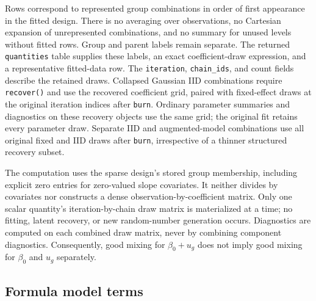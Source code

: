 \documentclass[11pt]{article}
\begin{document}
Rows correspond to represented group combinations in order of first appearance in the fitted design. There is no averaging over observations, no Cartesian expansion of unrepresented combinations, and no summary for unused levels without fitted rows. Group and parent labels remain separate. The returned \texttt{quantities} table supplies these labels, an exact coefficient-draw expression, and a representative fitted-data row. The \texttt{iteration}, \texttt{chain\_ids}, and count fields describe the retained draws. Collapsed Gaussian IID combinations require \texttt{recover()} and use the recovered coefficient grid, paired with fixed-effect draws at the original iteration indices after \texttt{burn}. Ordinary parameter summaries and diagnostics on these recovery objects use the same grid; the original fit retains every parameter draw. Separate IID and augmented-model combinations use all original fixed and IID draws after \texttt{burn}, irrespective of a thinner structured recovery subset.

The computation uses the sparse design's stored group membership, including explicit zero entries for zero-valued slope covariates. It neither divides by covariates nor constructs a dense observation-by-coefficient matrix. Only one scalar quantity's iteration-by-chain draw matrix is materialized at a time; no fitting, latent recovery, or new random-number generation occurs. Diagnostics are computed on each combined draw matrix, never by combining component diagnostics. Consequently, good mixing for $\beta_0+u_g$ does not imply good mixing for $\beta_0$ and $u_g$ separately.

\subsection{Formula model terms}
\end{document}
